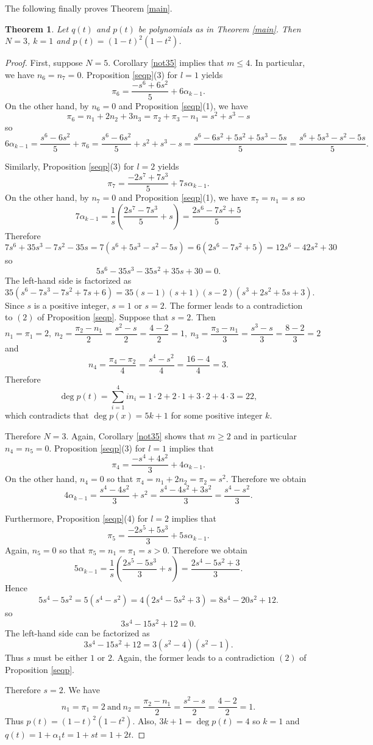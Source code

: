 \documentclass[reqno]{amsart}
\numberwithin{equation}{section}
\theoremstyle{plain}
\newtheorem{thm}[equation]{Theorem}
\theoremstyle{definition}
\begin{document}
The following finally proves Theorem \ref{main}.

\begin{thm}\label{N+1neq5}
Let $q(t)$ and $p(t)$ be polynomials as in Theorem \ref{main}. Then $N=3$, $k=1$ and $p(t)=(1-t)^2(1-t^2)$.
\end{thm}
\begin{proof}
First, suppose $N=5$. Corollary \ref{not35} implies that $m\leq 4$. In particular, we have $n_6=n_7=0$. Proposition \ref{seqp}(3) for $l=1$ yields
$$\pi_6=\frac{-s^6+6s^2}{5}+6\alpha_{k-1}.$$
On the other hand, by $n_6=0$ and Proposition \ref{seqp}(1), we have
$$\pi_6=n_1+2n_2+3n_3=\pi_2+\pi_3-n_1=s^2+s^3-s$$
so 
$$6\alpha_{k-1}=\frac{s^6-6s^2}{5}+\pi_6=\frac{s^6-6s^2}{5}+s^2+s^3-s=\frac{s^6-6s^2+5s^2+5s^3-5s}{5}=\frac{s^6+5s^3-s^2-5s}{5}.$$

Similarly, Proposition \ref{seqp}(3) for $l=2$ yields
$$\pi_7=\frac{-2s^7+7s^3}{5}+7s\alpha_{k-1}.$$
On the other hand, by $n_7=0$ and Proposition \ref{seqp}(1), we have $\pi_7=n_1=s$
so
$$7\alpha_{k-1}=\frac{1}{s}\left(\frac{2s^7-7s^3}{5}+s\right)=\frac{2s^6-7s^2+5}{5}$$
Therefore
$$7s^6+35s^3-7s^2-35s=7(s^6+5s^3-s^2-5s)=6(2s^6-7s^2+5)=12s^6-42s^2+30$$
so
$$5s^6-35s^3-35s^2+35s+30=0.$$
The left-hand side is factorized as
$$35(s^6-7s^3-7s^2+7s+6)=35(s-1)(s+1)(s-2)(s^3+2s^2+5s+3).$$
Since $s$ is a positive integer, $s=1$ or $s=2$. The former leads to a contradiction to $(2)$ of Proposition \ref{seqp}. Suppose that $s=2$. Then 
$$n_1=\pi_1=2,\ n_2=\frac{\pi_2-n_1}{2}=\frac{s^2-s}{2}=\frac{4-2}{2}=1,\ n_3=\frac{\pi_3-n_1}{3}=\frac{s^3-s}{3}=\frac{8-2}{3}=2$$
and
$$n_4=\frac{\pi_4-\pi_2}{4}=\frac{s^4-s^2}{4}=\frac{16-4}{4}=3.$$
Therefore 
$$\deg p(t)=\sum^4_{i=1}in_i=1\cdot 2+2\cdot 1+3\cdot 2+4\cdot 3=22,$$
which contradicts that $\deg p(x)=5k+1$ for some positive integer $k$.

Therefore $N=3$. Again, Corollary \ref{not35} shows that $m\geq 2$ and in particular $n_4=n_5=0$. Proposition \ref{seqp}(3) for $l=1$ implies that
$$\pi_4=\frac{-s^4+4s^2}{3}+4\alpha_{k-1}.$$
On the other hand, $n_4=0$ so that $\pi_4=n_1+2n_2=\pi_2=s^2$. Therefore we obtain
$$4\alpha_{k-1}=\frac{s^4-4s^2}{3}+s^2=\frac{s^4-4s^2+3s^2}{3}=\frac{s^4-s^2}{3}.$$

Furthermore, Proposition \ref{seqp}(4) for $l=2$ implies that
$$\pi_5=\frac{-2s^5+5s^3}{3}+5s\alpha_{k-1}.$$
Again, $n_5=0$ so that $\pi_5=n_1=\pi_1=s>0$. Therefore
we obtain
$$5\alpha_{k-1}=\frac{1}{s}\left(\frac{2s^5-5s^3}{3}+s\right)=\frac{2s^4-5s^2+3}{3}.$$
Hence
$$5s^4-5s^2=5(s^4-s^2)=4(2s^4-5s^2+3)=8s^4-20s^2+12.$$
so
$$3s^4-15s^2+12=0.$$
The left-hand side can be factorized as
$$3s^4-15s^2+12=3(s^2-4)(s^2-1).$$
Thus $s$ must be either $1$ or $2$. 
Again, the former leads to a contradiction $(2)$ of Proposition \ref{seqp}.

Therefore $s=2$. We have
$$n_1=\pi_1=2\ \text{and}\ n_2=\frac{\pi_2-n_1}{2}=\frac{s^2-s}{2}=\frac{4-2}{2}=1.$$ 
Thus $p(t)=(1-t)^2(1-t^2)$. Also, $3k+1=\deg p(t)=4$ so $k=1$ and $q(t)=1+\alpha_1t=1+st=1+2t$. 
\end{proof}
\end{document}
